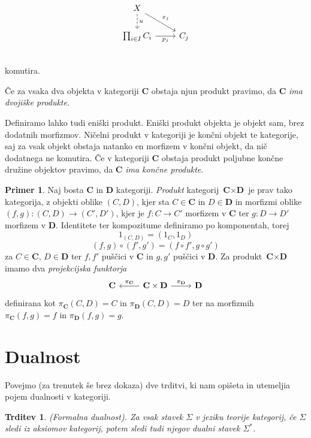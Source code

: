 \documentclass[12pt,a4paper]{book}
\theoremstyle{definition}
\theoremstyle{plain}
\newtheorem{trditev}[definicija]{Trditev}
\theoremstyle{definition}
\newtheorem{primer}{Primer}[section]
\theoremstyle{remark}
\newcommand{\cat}[1]{\textbf{#1}}
\begin{document}
$$\begin{tikzcd}
X \ar[d, dashed, "u"] \ar[dr, "x_j"] & \\
\prod_{i \in I}C_i \ar[r, "p_j"'] & C_j \\
\end{tikzcd}$$
komutira.

Če za vsaka dva objekta v kategoriji $\cat{C}$ obstaja njun produkt pravimo, da $\cat{C}$ \emph{ima dvojiške produkte}.

Definiramo lahko tudi eniški produkt. Eniški produkt objekta je objekt sam, brez dodatnih morfizmov. Ničelni produkt v kategoriji je končni objekt te kategorije, saj za vsak objekt obstaja natanko en morfizem v končni objekt, da nič dodatnega ne komutira. Če v kategoriji $\cat{C}$ obstaja produkt poljubne končne družine objektov pravimo, da $\cat{C}$ \emph{ima končne produkte}.

\begin{primer}
Naj bosta $\cat{C}$ in $\cat{D}$ kategoriji. \emph{Produkt} kategorij $\cat{C} \times \cat{D}$ je prav tako kategorija, z objekti oblike $(C,D)$, kjer sta $C \in \cat{C}$ in $D \in \cat{D}$ in morfizmi oblike $(f,g) : (C,D) \to (C',D')$, kjer je $f : C \to C'$ morfizem v $\cat{C}$ ter $g : D \to D'$ morfizem v $\cat{D}$. Identitete ter kompozitume definiramo po komponentah, torej
\begin{equation*}
1_{(C,D)} = (1_C,1_D)
\end{equation*}
\begin{equation*}
(f,g) \circ (f',g') = (f \circ f', g \circ g')
\end{equation*}
za $C \in \cat{C}$, $D \in \cat{D}$ ter $f,f'$ puščici v $\cat{C}$ in $g,g'$ puščici v $\cat{D}$.
Za produkt $\cat{C} \times \cat{D}$ imamo dva \textit{projekcijska funktorja} 
\[
\begin{tikzcd}
\cat{C} & \arrow[l, "\pi_{\cat{C}}"'] \cat{C} \times \cat{D} \arrow[r, "\pi_{\cat{D}}"] & \cat{D}
\end{tikzcd}
\]
definirana kot $\pi_{\cat{C}}(C,D) = C$ in $\pi_{\cat{D}}(C,D) = D$ ter na morfizmih $\pi_{\cat{C}}(f,g) = f$ in $\pi_{\cat{D}}(f,g) = g$.
\end{primer}

\section{Dualnost}
Povejmo (za trenutek še brez dokaza) dve trditvi, ki nam opišeta in utemeljia pojem dualnosti v kategoriji.

\begin{trditev} \textit{(Formalna dualnost)}. 
Za vsak stavek $\Sigma$ v jeziku teorije kategorij, če $\Sigma$ sledi iz aksiomov kategorij, potem sledi tudi njegov dualni stavek $\Sigma^*$.
\end{trditev}
\end{document}
